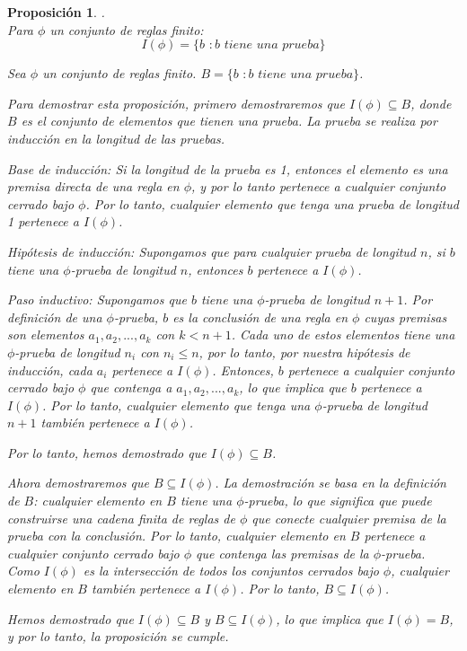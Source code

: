 \documentclass[executivepaper]{article}
\newtheorem{propo}{Proposición}[section]
\begin{document}
\begin{propo}.\\
Para $\phi$ un conjunto de reglas finito:
$$I(\phi) = \{b \,\,: b\,\, tiene\,\, una\,\, prueba\}$$

Sea $\phi$ un conjunto de reglas finito. $B = \{b \,\,: b\,\, tiene\,\, una\,\, prueba\}$.

Para demostrar esta proposición, primero demostraremos que $I(\phi) \subseteq B$, donde $B$ es el conjunto de elementos que tienen una prueba. La prueba se realiza por inducción en la longitud de las pruebas.

Base de inducción: Si la longitud de la prueba es 1, entonces el elemento es una premisa directa de una regla en $\phi$, y por lo tanto pertenece a cualquier conjunto cerrado bajo $\phi$. Por lo tanto, cualquier elemento que tenga una prueba de longitud 1 pertenece a $I(\phi)$.

Hipótesis de inducción: Supongamos que para cualquier prueba de longitud $n$, si $b$ tiene una $\phi$-prueba de longitud $n$, entonces $b$ pertenece a $I(\phi)$.

Paso inductivo: Supongamos que $b$ tiene una $\phi$-prueba de longitud $n+1$. Por definición de una $\phi$-prueba, $b$ es la conclusión de una regla en $\phi$ cuyas premisas son elementos $a_1, a_2, ..., a_k$ con $k < n+1$. Cada uno de estos elementos tiene una $\phi$-prueba de longitud $n_i$ con $n_i \leq n$, por lo tanto, por nuestra hipótesis de inducción, cada $a_i$ pertenece a $I(\phi)$. Entonces, $b$ pertenece a cualquier conjunto cerrado bajo $\phi$ que contenga a $a_1, a_2, ..., a_k$, lo que implica que $b$ pertenece a $I(\phi)$. Por lo tanto, cualquier elemento que tenga una $\phi$-prueba de longitud $n+1$ también pertenece a $I(\phi)$.

Por lo tanto, hemos demostrado que $I(\phi) \subseteq B$.

Ahora demostraremos que $B \subseteq I(\phi)$. La demostración se basa en la definición de $B$: cualquier elemento en $B$ tiene una $\phi$-prueba, lo que significa que puede construirse una cadena finita de reglas de $\phi$ que conecte cualquier premisa de la prueba con la conclusión. Por lo tanto, cualquier elemento en $B$ pertenece a cualquier conjunto cerrado bajo $\phi$ que contenga las premisas de la $\phi$-prueba. Como $I(\phi)$ es la intersección de todos los conjuntos cerrados bajo $\phi$, cualquier elemento en $B$ también pertenece a $I(\phi)$. Por lo tanto, $B \subseteq I(\phi)$.

Hemos demostrado que $I(\phi) \subseteq B$ y $B \subseteq I(\phi)$, lo que implica que $I(\phi) = B$, y por lo tanto, la proposición se cumple.
\end{propo}
\end{document}
